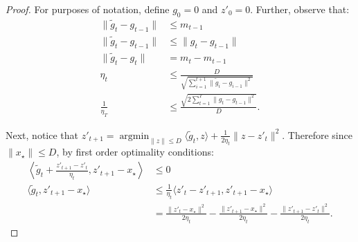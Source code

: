 \documentclass{article}
\begin{document}
\begin{proof}
For purposes of notation, define $g_0=0$ and $z'_0=0$. Further, observe that:
\begin{align*}
\|\tilde g_t -g_{t-1}\|&\le m_{t-1}\\
\|\tilde g_t - g_{t-1}\|&\le \|g_t-g_{t-1}\|\\
    \|\tilde g_t - g_t\| &= m_t - m_{t-1}\\
    \eta_t &\le \frac{D}{\sqrt{\sum_{i=1}^{t+1} \|\tilde g_i - g_{i-1}\|^2}}\\
    \frac{1}{\eta_T}&\le \frac{\sqrt{2\sum_{t=1}^T \|g_t-g_{t-1}\|^2}}{D}.
\end{align*}


Next, notice that $z'_{t+1} = \mathop{\text{argmin}}_{\|z\|\le D} \langle \tilde g_t, z\rangle + \frac{1}{2\eta_t} \|z - z'_t\|^2$. Therefore since $\|x_\star\|\le D$, by first order optimality conditions:
\begin{align*}
    \left\langle  \tilde g_t + \frac{z'_{t+1}-z'_t}{\eta_t}, z'_{t+1}-x_\star\right\rangle &\le 0\\
    \langle \tilde g_t, z'_{t+1}-x_\star\rangle &\le \frac{1}{\eta_t} \langle z'_t - z'_{t+1}, z'_{t+1} - x_\star\rangle\\
    & = \frac{\|z'_t-x_\star\|^2}{2\eta_t} - \frac{\|z'_{t+1}- x_\star\|^2}{2\eta_t} - \frac{\|z'_{t+1} - z'_t\|^2}{2\eta_t}.
\end{align*}


\end{proof}
\end{document}

